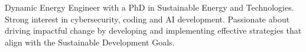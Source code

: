 
\begin{cvparagraph}

Dynamic Energy Engineer with a PhD in Sustainable Energy and Technologies. Strong interest in cybersecurity, coding and AI development. Passionate about driving impactful change by developing and implementing effective strategies that align with the Sustainable Development Goals.

\end{cvparagraph}